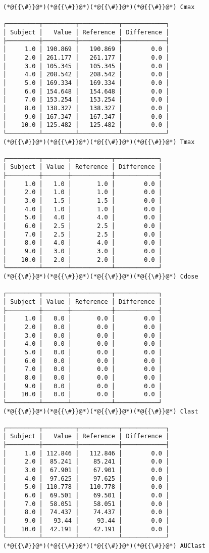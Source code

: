 \documentclass[12pt,a4paper]{article}
\begin{document}
\begin{lstlisting}
(*@{{\#}}@*)(*@{{\#}}@*)(*@{{\#}}@*)(*@{{\#}}@*) Cmax

┌─────────┬─────────┬───────────┬────────────┐
│ Subject │   Value │ Reference │ Difference │
├─────────┼─────────┼───────────┼────────────┤
│     1.0 │ 190.869 │   190.869 │        0.0 │
│     2.0 │ 261.177 │   261.177 │        0.0 │
│     3.0 │ 105.345 │   105.345 │        0.0 │
│     4.0 │ 208.542 │   208.542 │        0.0 │
│     5.0 │ 169.334 │   169.334 │        0.0 │
│     6.0 │ 154.648 │   154.648 │        0.0 │
│     7.0 │ 153.254 │   153.254 │        0.0 │
│     8.0 │ 138.327 │   138.327 │        0.0 │
│     9.0 │ 167.347 │   167.347 │        0.0 │
│    10.0 │ 125.482 │   125.482 │        0.0 │
└─────────┴─────────┴───────────┴────────────┘
(*@{{\#}}@*)(*@{{\#}}@*)(*@{{\#}}@*)(*@{{\#}}@*) Tmax

┌─────────┬───────┬───────────┬────────────┐
│ Subject │ Value │ Reference │ Difference │
├─────────┼───────┼───────────┼────────────┤
│     1.0 │   1.0 │       1.0 │        0.0 │
│     2.0 │   1.0 │       1.0 │        0.0 │
│     3.0 │   1.5 │       1.5 │        0.0 │
│     4.0 │   1.0 │       1.0 │        0.0 │
│     5.0 │   4.0 │       4.0 │        0.0 │
│     6.0 │   2.5 │       2.5 │        0.0 │
│     7.0 │   2.5 │       2.5 │        0.0 │
│     8.0 │   4.0 │       4.0 │        0.0 │
│     9.0 │   3.0 │       3.0 │        0.0 │
│    10.0 │   2.0 │       2.0 │        0.0 │
└─────────┴───────┴───────────┴────────────┘
(*@{{\#}}@*)(*@{{\#}}@*)(*@{{\#}}@*)(*@{{\#}}@*) Cdose

┌─────────┬───────┬───────────┬────────────┐
│ Subject │ Value │ Reference │ Difference │
├─────────┼───────┼───────────┼────────────┤
│     1.0 │   0.0 │       0.0 │        0.0 │
│     2.0 │   0.0 │       0.0 │        0.0 │
│     3.0 │   0.0 │       0.0 │        0.0 │
│     4.0 │   0.0 │       0.0 │        0.0 │
│     5.0 │   0.0 │       0.0 │        0.0 │
│     6.0 │   0.0 │       0.0 │        0.0 │
│     7.0 │   0.0 │       0.0 │        0.0 │
│     8.0 │   0.0 │       0.0 │        0.0 │
│     9.0 │   0.0 │       0.0 │        0.0 │
│    10.0 │   0.0 │       0.0 │        0.0 │
└─────────┴───────┴───────────┴────────────┘
(*@{{\#}}@*)(*@{{\#}}@*)(*@{{\#}}@*)(*@{{\#}}@*) Clast

┌─────────┬─────────┬───────────┬────────────┐
│ Subject │   Value │ Reference │ Difference │
├─────────┼─────────┼───────────┼────────────┤
│     1.0 │ 112.846 │   112.846 │        0.0 │
│     2.0 │  85.241 │    85.241 │        0.0 │
│     3.0 │  67.901 │    67.901 │        0.0 │
│     4.0 │  97.625 │    97.625 │        0.0 │
│     5.0 │ 110.778 │   110.778 │        0.0 │
│     6.0 │  69.501 │    69.501 │        0.0 │
│     7.0 │  58.051 │    58.051 │        0.0 │
│     8.0 │  74.437 │    74.437 │        0.0 │
│     9.0 │   93.44 │     93.44 │        0.0 │
│    10.0 │  42.191 │    42.191 │        0.0 │
└─────────┴─────────┴───────────┴────────────┘
(*@{{\#}}@*)(*@{{\#}}@*)(*@{{\#}}@*)(*@{{\#}}@*) AUClast


\end{lstlisting}
\end{document}
